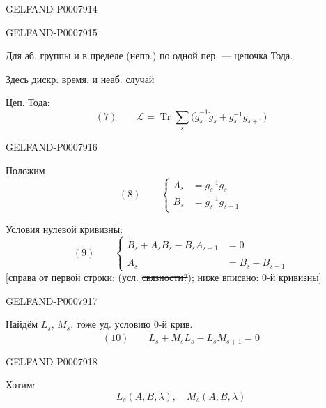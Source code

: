 \begin{GelfandAdjacentEvidence}{GELFAND-P000791}{4}

\end{GelfandAdjacentEvidence}
\begin{GelfandAdjacentEvidence}{GELFAND-P000791}{5}


Для аб. группы и в пределе (непр.) по одной пер. --- цепочка Тода.

Здесь дискр. время. и неаб. случай

Цеп. Тода:
\[
(7)\qquad \mathcal{L}=\operatorname{Tr}\sum_s
\bigl(\dot{g}_s^{-1}\dot{g}_s+g_s^{-1}g_{s+1}\bigr)
\]
\end{GelfandAdjacentEvidence}
\begin{GelfandAdjacentEvidence}{GELFAND-P000791}{6}


Положим
\[
(8)\qquad\left\{\begin{aligned}
A_s&=g_s^{-1}\dot{g}_s\\
B_s&=g_s^{-1}g_{s+1}
\end{aligned}\right.
\]

Условия нулевой кривизны:
\[
(9)\qquad\left\{\begin{aligned}
\dot{B}_s+A_sB_s-B_sA_{s+1}&=0\\
\dot{A}_s&=B_s-B_{s-1}
\end{aligned}\right.
\]
[справа от первой строки: (усл. \sout{связности?}); ниже вписано: 0-й кривизны]
\end{GelfandAdjacentEvidence}
\begin{GelfandAdjacentEvidence}{GELFAND-P000791}{7}


Найдём \(L_s\), \(M_s\), тоже уд. условию 0-й крив.
\[
(10)\qquad\dot{L}_s+M_sL_s-L_sM_{s+1}=0
\]
\end{GelfandAdjacentEvidence}
\begin{GelfandAdjacentEvidence}{GELFAND-P000791}{8}


Хотим:
\[
L_s(A,B,\lambda),\quad M_s(A,B,\lambda)
\]
\end{GelfandAdjacentEvidence}


